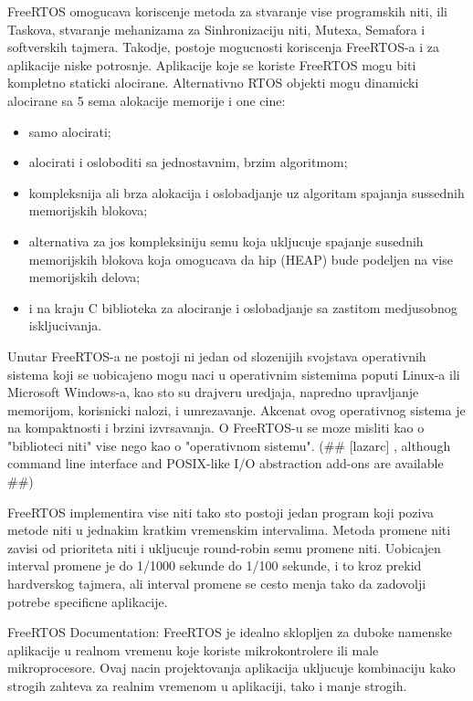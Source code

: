 \documentclass[a4paper,12pt, master]{etf}
\begin{document}
	FreeRTOS omogucava koriscenje metoda za stvaranje vise programskih niti, ili Taskova, stvaranje
	mehanizama za Sinhronizaciju niti, Mutexa, Semafora i softverskih tajmera. Takodje, postoje
	mogucnosti koriscenja FreeRTOS-a i za aplikacije niske potrosnje. Aplikacije koje se koriste
	FreeRTOS mogu biti kompletno staticki alocirane. Alternativno RTOS objekti mogu dinamicki
	alocirane sa 5 sema alokacije memorije i one cine:
	\begin{itemize}
		\item samo alocirati;
		\item alocirati i osloboditi sa jednostavnim, brzim algoritmom;
		\item kompleksnija ali brza alokacija i oslobadjanje uz algoritam spajanja sussednih
		memorijskih blokova;
		\item alternativa za jos kompleksiniju semu koja ukljucuje spajanje susednih memorijskih
		blokova	koja omogucava da hip (HEAP) bude podeljen na vise memorijskih delova;
		\item i na kraju C biblioteka za alociranje i oslobadjanje sa zastitom medjusobnog iskljucivanja.
	\end{itemize}

	Unutar FreeRTOS-a ne postoji ni jedan od slozenijih svojstava operativnih sistema koji se
	uobicajeno mogu naci u operativnim sistemima poputi Linux-a ili Microsoft Windows-a, kao sto su
	drajveru uredjaja, napredno upravljanje memorijom, korisnicki nalozi, i umrezavanje. Akcenat
	ovog operativnog sistema je na kompaktnosti i brzini izvrsavanja. O FreeRTOS-u se moze misliti
	kao o "biblioteci niti" vise nego kao o "operativnom sistemu". (\#\# [lazarc] , although command
	line interface and POSIX-like I/O abstraction add-ons are available \#\#)

	FreeRTOS implementira vise niti tako sto postoji jedan program koji poziva metode niti u
	jednakim kratkim vremenskim intervalima. Metoda promene niti zavisi od prioriteta niti i
	ukljucuje round-robin semu promene niti. Uobicajen interval promene je do 1/1000 sekunde do
	1/100 sekunde, i to kroz prekid hardverskog tajmera, ali interval promene se cesto menja tako
	da zadovolji potrebe specificne aplikacije.

	FreeRTOS Documentation:
	FreeRTOS je idealno sklopljen za duboke namenske aplikacije u realnom vremenu koje koriste
	mikrokontrolere ili male mikroprocesore. Ovaj nacin projektovanja aplikacija ukljucuje
	kombinaciju kako strogih zahteva za realnim vremenom u aplikaciji, tako i manje strogih.
\end{document}
